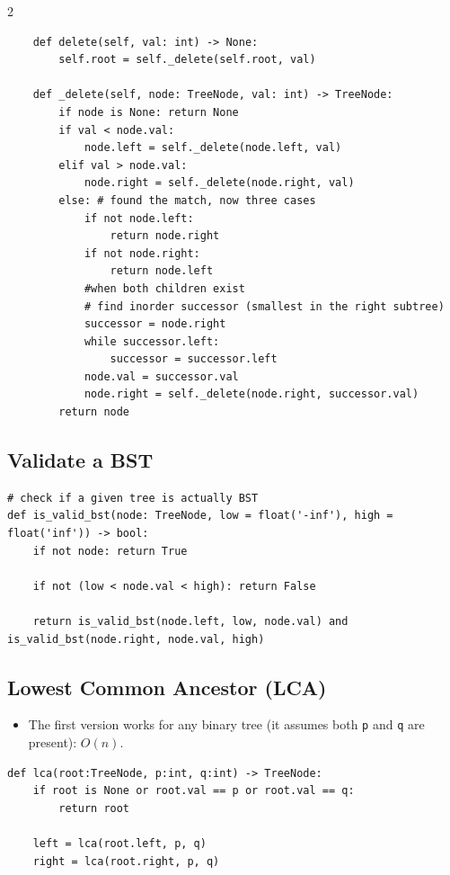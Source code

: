 \documentclass[9pt,a4paper]{extarticle}
\begin{document}
\begin{multicols}{2}
\begin{lstlisting}
    def delete(self, val: int) -> None:
        self.root = self._delete(self.root, val)

    def _delete(self, node: TreeNode, val: int) -> TreeNode:
        if node is None: return None
        if val < node.val:
            node.left = self._delete(node.left, val)
        elif val > node.val:
            node.right = self._delete(node.right, val)
        else: # found the match, now three cases
            if not node.left:
                return node.right
            if not node.right:
                return node.left
            #when both children exist
            # find inorder successor (smallest in the right subtree)
            successor = node.right
            while successor.left:
                successor = successor.left
            node.val = successor.val
            node.right = self._delete(node.right, successor.val)
        return node
\end{lstlisting}

\subsection{Validate a BST}

\begin{lstlisting}
# check if a given tree is actually BST
def is_valid_bst(node: TreeNode, low = float('-inf'), high = float('inf')) -> bool:
    if not node: return True

    if not (low < node.val < high): return False

    return is_valid_bst(node.left, low, node.val) and is_valid_bst(node.right, node.val, high)
\end{lstlisting}

\subsection{Lowest Common Ancestor (LCA)}

\begin{itemize}
\item The first version works for any binary tree (it assumes both \texttt{p} and \texttt{q} are present): $O(n)$.
\end{itemize}

\begin{lstlisting}
def lca(root:TreeNode, p:int, q:int) -> TreeNode:
    if root is None or root.val == p or root.val == q:
        return root

    left = lca(root.left, p, q)
    right = lca(root.right, p, q)


\end{lstlisting}
\end{multicols}
\end{document}
